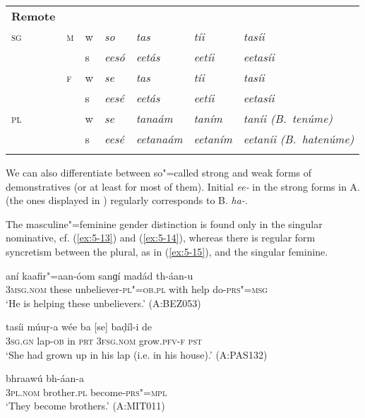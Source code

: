 \begin{table}[htp]
\begin{tabularx}{\textwidth}{ l l l Q Q Q P{23mm} }
\textbf{Remote} &
&
&
&
&
&
\\
\textsc{sg} &
\textsc{m} &
w &
\textit{so} &
\textit{tas} &
\textit{tíi} &
\textit{tasíi} \\
&
&
s &
\textit{eesó} &
\textit{eetás} &
\textit{eetíi} &
\textit{eetasíi} \\
&
\textsc{f} &
w &
\textit{se} &
\textit{tas} &
\textit{tíi} &
\textit{tasíi} \\
&
&
s &
\textit{eesé} &
\textit{eetás} &
\textit{eetíi} &
\textit{eetasíi} \\
\textsc{pl} &
&
w &
\textit{se} &
\textit{tanaám} &
\textit{taním} &
\textit{taníi (B.~tenúme)}\\
&
&
s &
\textit{eesé} &
\textit{eetanaám} &
\textit{eetaním} &
\textit{eetaníi (B.~hatenúme)}\\\lspbottomrule
\end{tabularx}
\label{tab:5-4}
\end{table}

We can also differentiate between so"=called strong and weak forms of demonstratives (or at least for most of them). Initial \textit{ee-} in the strong forms in A. (the ones displayed in ) regularly corresponds to B. \textit{ha-}. 

The masculine"=feminine gender distinction is found only in the singular nominative, cf. (\ref{ex:5-13}) and (\ref{ex:5-14}), whereas there is regular form syncretism between the plural, as in (\ref{ex:5-15}), and the singular feminine. 


\begin{exe}
\ex
\label{ex:5-13}
\gll [so] aní kaafir"=aan-óom sanɡí madád th-áan-u \\
\textsc{3msg}.\textsc{nom} these unbeliever-\textsc{pl"=ob.pl} with help do-\textsc{prs"=msg}\\
\glt `He is helping these unbelievers.' (A:BEZ053)

\ex
\label{ex:5-14}
\gll tasíi múuṛ-a wée ba [se] baḍíl-i de \\
\textsc{3sg}.\textsc{gn} lap-\textsc{ob} in \textsc{prt} \textsc{3fsg}.\textsc{nom}
grow.\textsc{pfv-f} \textsc{pst}\\
\glt `She had grown up in his lap (i.e. in his house).' (A:PAS132)

\ex
\label{ex:5-15}
\gll [se] bhraawú bh-áan-a\\
\textsc{3pl}.\textsc{nom} brother.\textsc{pl} become-\textsc{prs"=mpl}\\
\glt `They become brothers.' (A:MIT011)
\end{exe}

